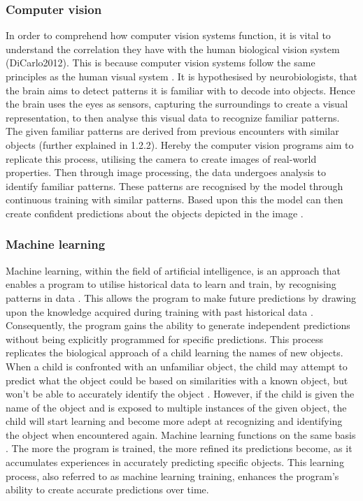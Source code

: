 \subsubsection{Computer vision}
In order to comprehend how computer vision systems function, it is vital to understand the correlation they have with the human biological vision system (DiCarlo2012). This is because computer vision systems follow the same principles as the human visual system \parencite[pp.~1--3]{Voulodimos2018}. It is hypothesised by neurobiologists, that the brain aims to detect patterns it is familiar with to decode into objects. Hence the brain uses the eyes as sensors, capturing the surroundings to create a visual representation, to then analyse this visual data to recognize familiar patterns. The given familiar patterns are derived from previous encounters with similar objects (further explained in 1.2.2). Hereby the computer vision programs aim to replicate this process, utilising the camera to create images of real-world properties. Then through image processing, the data undergoes analysis to identify familiar patterns. These patterns are recognised by the model through continuous training with similar patterns. Based upon this the model can then create confident predictions about the objects depicted in the image \parencite[pp.~1--7]{Jahne2000}. \\

\subsubsection{Machine learning }
Machine learning, within the field of artificial intelligence, is an approach that enables a program to utilise historical data to learn and train, by recognising patterns in data  \parencite[pp.~2--4]{Zhou2021}. This allows the program to make future predictions by drawing upon the knowledge acquired during training with past historical data \parencite[pp.~6--10]{Mitchell1983}. Consequently, the program gains the ability to generate independent predictions without being explicitly programmed for specific predictions. This process replicates the biological approach of a child learning the names of new objects. When a child is confronted with an unfamiliar object, the child may attempt to predict what the object could be based on similarities with a known object, but won't be able to accurately identify the object \parencite[pp.~6--10]{Harrington2012}. However,  if the child is given the name of the object and is exposed to multiple instances of the given object, the child will start learning and become more adept at recognizing and identifying the object when encountered again. Machine learning functions on the same basis \parencite[p.~16]{Gollapudi2016}. The more the program is trained, the more refined its predictions become, as it accumulates experiences in accurately predicting specific objects. This learning process, also referred to as machine learning training, enhances the program's ability to create accurate predictions over time. \\

